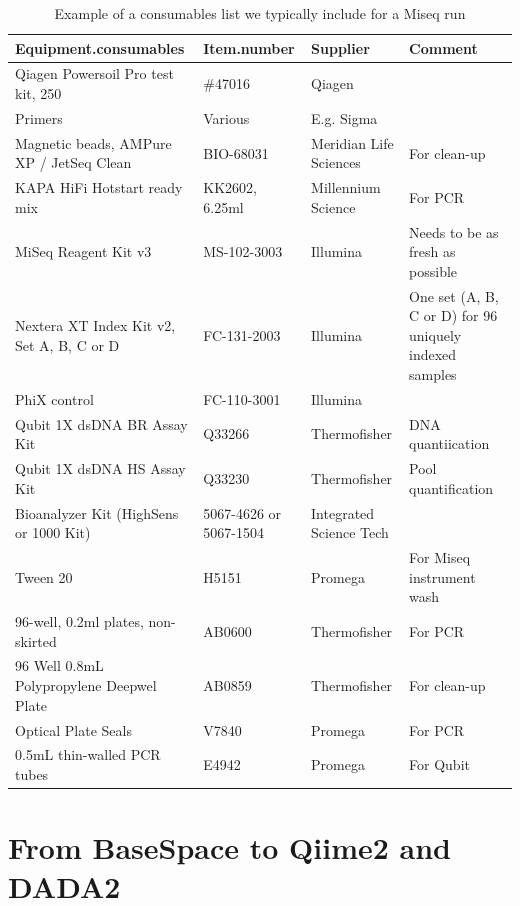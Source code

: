 \documentclass[
]{book}
\begin{document}
\begin{table}

\caption{\label{tab:consumables}Example of a consumables list we typically include for a Miseq run}
\centering
\begin{tabular}[t]{llll}
\toprule
Equipment.consumables & Item.number & Supplier & Comment\\
\midrule
Qiagen Powersoil Pro test kit, 250 & \#47016 & Qiagen & \\
Primers & Various & E.g. Sigma & \\
Magnetic beads,  AMPure XP / JetSeq Clean & BIO-68031 & Meridian Life Sciences & For clean-up\\
KAPA HiFi Hotstart ready mix & KK2602, 6.25ml & Millennium Science & For PCR\\
MiSeq Reagent Kit v3 & MS-102-3003 & Illumina & Needs to be as fresh as possible\\
\addlinespace
Nextera XT Index Kit v2, Set A, B, C or D & FC-131-2003 & Illumina & One set (A, B, C or D) for 96 uniquely  indexed samples\\
PhiX control & FC-110-3001 & Illumina & \\
Qubit 1X dsDNA BR Assay Kit & Q33266 & Thermofisher & DNA quantiication\\
Qubit 1X dsDNA HS Assay Kit & Q33230 & Thermofisher & Pool quantification\\
Bioanalyzer Kit (HighSens or 1000 Kit) & 5067-4626 or 5067-1504 & Integrated Science Tech & \\
\addlinespace
Tween 20 & H5151 & Promega & For Miseq instrument wash\\
96-well, 0.2ml plates, non-skirted & AB0600 & Thermofisher & For PCR\\
96 Well 0.8mL Polypropylene Deepwel Plate & AB0859 & Thermofisher & For clean-up\\
Optical Plate Seals & V7840 & Promega & For PCR\\
0.5mL thin-walled PCR tubes & E4942 & Promega & For Qubit\\
\bottomrule
\end{tabular}
\end{table}

\hypertarget{from-basespace-to-qiime2-and-dada2}{%
\chapter{From BaseSpace to Qiime2 and DADA2}\label{from-basespace-to-qiime2-and-dada2}}
\end{document}
